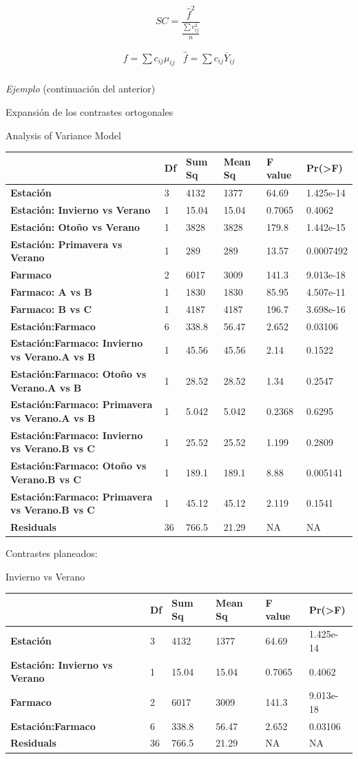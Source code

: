 \documentclass[]{book}
\theoremstyle{definition}
\theoremstyle{definition}
\theoremstyle{definition}
\theoremstyle{remark}
\begin{document}
\[
SC = \frac{{\hat{f}}^{2}}{\frac{\sum c_{ij}^{2}}{n}}\ 
\]

\[
\begin{matrix}
f = \sum c_{ij}\mu_{ij} & \hat{f} = \sum c_{ij}\overline{Y}_{ij} \\
\end{matrix}
\]

\emph{Ejemplo} (continuación del anterior)

Expansión de los contrastes ortogonales

Analysis of Variance Model

\begin{longtable}[]{@{}llllll@{}}
\toprule
& Df & Sum Sq & Mean Sq & F value & Pr(\textgreater{}F)\tabularnewline
\midrule
\endhead
\textbf{Estación} & 3 & 4132 & 1377 & 64.69 & 1.425e-14\tabularnewline
\textbf{Estación: Invierno vs Verano} & 1 & 15.04 & 15.04 & 0.7065 &
0.4062\tabularnewline
\textbf{Estación: Otoño vs Verano} & 1 & 3828 & 3828 & 179.8 &
1.442e-15\tabularnewline
\textbf{Estación: Primavera vs Verano} & 1 & 289 & 289 & 13.57 &
0.0007492\tabularnewline
\textbf{Farmaco} & 2 & 6017 & 3009 & 141.3 & 9.013e-18\tabularnewline
\textbf{Farmaco: A vs B} & 1 & 1830 & 1830 & 85.95 &
4.507e-11\tabularnewline
\textbf{Farmaco: B vs C} & 1 & 4187 & 4187 & 196.7 &
3.698e-16\tabularnewline
\textbf{Estación:Farmaco} & 6 & 338.8 & 56.47 & 2.652 &
0.03106\tabularnewline
\textbf{Estación:Farmaco: Invierno vs Verano.A vs B} & 1 & 45.56 & 45.56
& 2.14 & 0.1522\tabularnewline
\textbf{Estación:Farmaco: Otoño vs Verano.A vs B} & 1 & 28.52 & 28.52 &
1.34 & 0.2547\tabularnewline
\textbf{Estación:Farmaco: Primavera vs Verano.A vs B} & 1 & 5.042 &
5.042 & 0.2368 & 0.6295\tabularnewline
\textbf{Estación:Farmaco: Invierno vs Verano.B vs C} & 1 & 25.52 & 25.52
& 1.199 & 0.2809\tabularnewline
\textbf{Estación:Farmaco: Otoño vs Verano.B vs C} & 1 & 189.1 & 189.1 &
8.88 & 0.005141\tabularnewline
\textbf{Estación:Farmaco: Primavera vs Verano.B vs C} & 1 & 45.12 &
45.12 & 2.119 & 0.1541\tabularnewline
\textbf{Residuals} & 36 & 766.5 & 21.29 & NA & NA\tabularnewline
\bottomrule
\end{longtable}

Contrastes planeados:

Invierno vs Verano

\begin{longtable}[]{@{}llllll@{}}
\toprule
& Df & Sum Sq & Mean Sq & F value & Pr(\textgreater{}F)\tabularnewline
\midrule
\endhead
\textbf{Estación} & 3 & 4132 & 1377 & 64.69 & 1.425e-14\tabularnewline
\textbf{Estación: Invierno vs Verano} & 1 & 15.04 & 15.04 & 0.7065 &
0.4062\tabularnewline
\textbf{Farmaco} & 2 & 6017 & 3009 & 141.3 & 9.013e-18\tabularnewline
\textbf{Estación:Farmaco} & 6 & 338.8 & 56.47 & 2.652 &
0.03106\tabularnewline
\textbf{Residuals} & 36 & 766.5 & 21.29 & NA & NA\tabularnewline
\bottomrule
\end{longtable}
\end{document}
